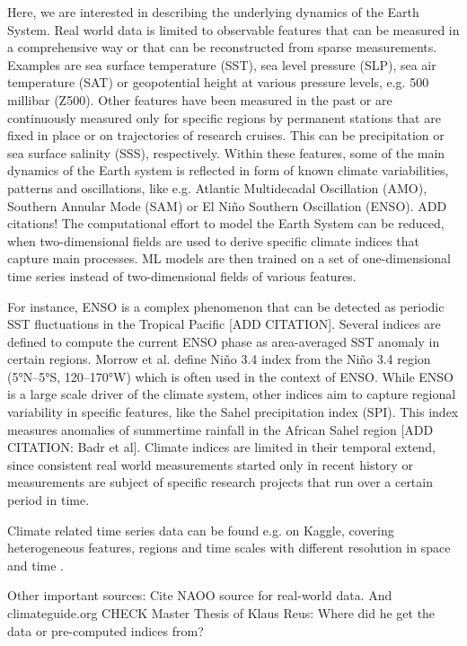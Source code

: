 \documentclass{CUP-JNL-DTM}%
\theoremstyle{definition}
\numberwithin{equation}{section}
\begin{document}
Here, we are interested in describing the underlying dynamics of the Earth System. Real world data is limited to observable features that can be measured in a comprehensive way or that can be reconstructed from sparse measurements. Examples are sea surface temperature (SST), sea level pressure (SLP), sea air temperature (SAT) or geopotential height at various pressure levels, e.g. 500 millibar (Z500). Other features have been measured in the past or are continuously measured only for specific regions by permanent stations that are fixed in place or on trajectories of research cruises. This can be precipitation or sea surface salinity (SSS), respectively. Within these features, some of the main dynamics of the Earth system is reflected in form of known climate variabilities, patterns and oscillations, like e.g. Atlantic Multidecadal Oscillation (AMO), Southern Annular Mode (SAM) or El Ni\~{n}o Southern Oscillation (ENSO). ADD citations! The computational effort to model the Earth System can be reduced, when two-dimensional fields are used to derive specific climate indices that capture main processes. ML models are then trained on a set of one-dimensional time series instead of two-dimensional fields of various features.

For instance, ENSO is a complex phenomenon that can be detected as periodic SST fluctuations in the Tropical Pacific [ADD CITATION]. Several indices are defined to compute the current ENSO phase as area-averaged SST anomaly in certain regions. Morrow et al. define Ni\~{n}o 3.4 index from the Ni\~{n}o 3.4 region (5°N–5°S, 120–170°W) which is often used in the context of ENSO. While ENSO is a large scale driver of the climate system, other indices aim to capture regional variability in specific features, like the Sahel precipitation index (SPI). This index measures anomalies of summertime rainfall in the African Sahel region [ADD CITATION: Badr et al]. Climate indices are limited in their temporal extend, since consistent real world measurements started only in recent history or measurements are subject of specific research projects that run over a certain period in time. 

Climate related time series data can be found e.g. on Kaggle, covering heterogeneous features, regions and time scales with different resolution in space and time \cite{https://www.kaggle.com/datasets/sumanthvrao/daily-climate-time-series-data  or https://www.kaggle.com/datasets/shabanamir/enso-data}.

Other important sources: Cite NAOO source for real-world data. And climateguide.org
CHECK Master Thesis of Klaus Reus: Where did he get the data or pre-computed indices from?
\end{document}

